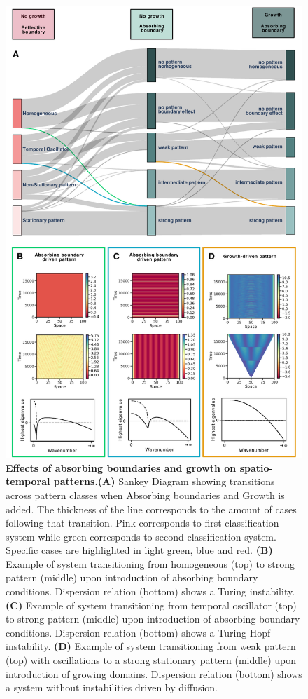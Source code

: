 \begin{figure}[H]
    \includegraphics[width=1\textwidth]{figures/boundaries_growth} %
    \caption{\textbf{Effects of absorbing boundaries and growth on spatio-temporal patterns.}\textbf{(A)} Sankey Diagram showing transitions across pattern classes when Absorbing boundaries and Growth is added. The thickness of the line corresponds to the amount of cases following that transition. Pink corresponds to first classification system while green corresponds to second classification system. Specific cases are highlighted in light green, blue and red. \textbf{(B)} Example of system transitioning from homogeneous (top) to strong pattern (middle) upon introduction of absorbing boundary conditions. Dispersion relation (bottom) shows a Turing instability. \textbf{(C)} Example of system transitioning from temporal oscillator (top) to strong pattern (middle) upon introduction of absorbing boundary conditions. Dispersion relation (bottom) shows a Turing-Hopf instability. \textbf{(D)} Example of system transitioning from weak pattern (top) with oscillations to a strong stationary pattern (middle) upon introduction of growing domains. Dispersion relation (bottom) shows a system without instabilities driven by diffusion.  }
    \label{fig:boundariesgrowth} %
\end{figure}


